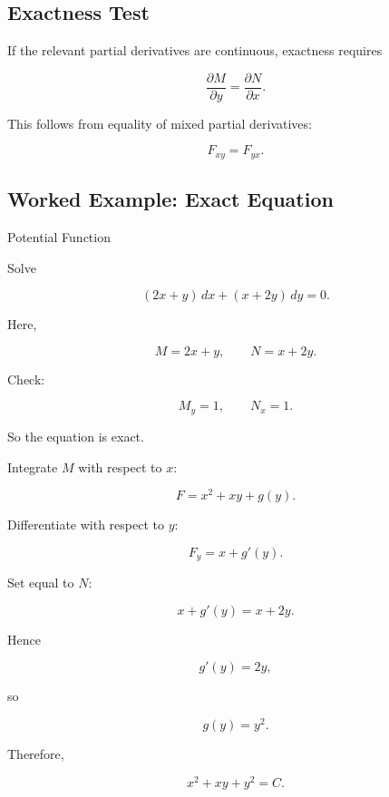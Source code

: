 \subsection{Exactness Test}
\label{subsec:exactness-test}

If the relevant partial derivatives are continuous, exactness requires

\[
\boxed{
\frac{\partial M}{\partial y}
=
\frac{\partial N}{\partial x}.
}
\]

This follows from equality of mixed partial derivatives:

\[
F_{xy}=F_{yx}.
\]

\subsection{Worked Example: Exact Equation}
\label{subsec:worked-exact-equation}

\begin{workedexamplebox}{Potential Function}

Solve

\[
(2x+y)\,dx
+
(x+2y)\,dy
=
0.
\]

Here,

\[
M=2x+y,
\qquad
N=x+2y.
\]

Check:

\[
M_y=1,
\qquad
N_x=1.
\]

So the equation is exact.

Integrate \(M\) with respect to \(x\):

\[
F
=
x^2+xy+g(y).
\]

Differentiate with respect to \(y\):

\[
F_y
=
x+g'(y).
\]

Set equal to \(N\):

\[
x+g'(y)
=
x+2y.
\]

Hence

\[
g'(y)=2y,
\]

so

\[
g(y)=y^2.
\]

Therefore,

\begin{answerbox}
\[
\boxed{
x^2+xy+y^2=C.
}
\]
\end{answerbox}

\end{workedexamplebox}

